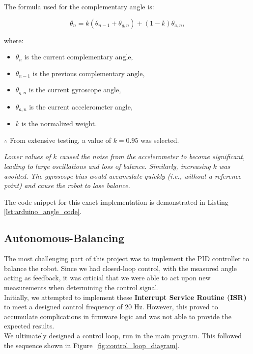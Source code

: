 \documentclass{article}
\begin{document}
The formula used for the complementary angle is:

\[
\theta_n = k(\theta_{n-1} + \theta_{g,n}) + (1-k)\theta_{a,n},
\]

where:
\begin{itemize}
    \item $\theta_n$ is the current complementary angle,
    \item $\theta_{n-1}$ is the previous complementary angle,
    \item $\theta_{g,n}$ is the current gyroscope angle,
    \item $\theta_{a,n}$ is the current accelerometer angle,
    \item $k$ is the normalized weight.
\end{itemize}

\begin{center}
    $\therefore$ From extensive testing, a value of $k = 0.95$ was selected. \\
\end{center}

\textit{
    Lower values of $k$ caused the noise from the accelerometer to become significant, leading to large oscillations and loss of balance.
    Similarly, increasing $k$ was avoided. The gyroscope bias would accumulate quickly (i.e., without a reference point)
    and cause the robot to lose balance.
}\vspace{0.5cm}

The code snippet for this exact implementation is demonstrated in Listing \ref{lst:arduino_angle_code}.

\subsection{Autonomous-Balancing}

\begin{minipage}{\linewidth}
    The most challenging part of this project was to implement the PID controller to balance the robot. Since we had closed-loop control,
    with the measured angle acting as feedback, it was crticial that we were able to act upon new measurements when determining the control signal. \\

    Initially, we attempted to implement these \textbf{Interrupt Service Routine (ISR)} to meet a designed control frequency of $20$ Hz.
    However, this proved to accumulate complications in firmware logic and was not able to provide the expected results. \\

    We ultimately designed a control loop, run in the main program. This followed the sequence shown in Figure~\ref{fig:control_loop_diagram}.
\end{minipage}
\end{document}

